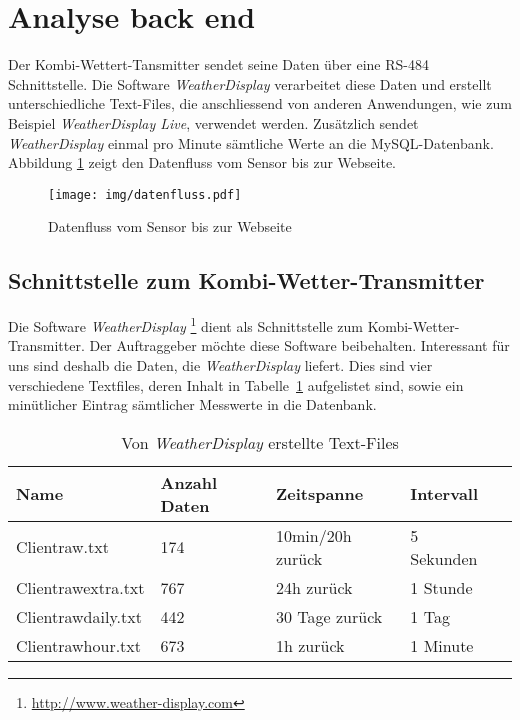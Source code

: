 \section{Analyse back end}
Der Kombi-Wettert-Tansmitter sendet seine Daten über eine RS-484 Schnittstelle. Die Software \textit{WeatherDisplay} verarbeitet diese Daten und erstellt unterschiedliche Text-Files, die anschliessend von anderen Anwendungen, wie zum Beispiel \textit{WeatherDisplay Live}, verwendet werden. Zusätzlich sendet \textit{WeatherDisplay} einmal pro Minute sämtliche Werte an die MySQL-Datenbank. Abbildung \ref{img:datenfluss} zeigt den Datenfluss vom Sensor bis zur Webseite. 

\begin{figure}[h!]
	\centering
	\texttt{[image: img/datenfluss.pdf]}
	\caption{Datenfluss vom Sensor bis zur Webseite}
	\label{img:datenfluss}
\end{figure}



\subsection{Schnittstelle zum Kombi-Wetter-Transmitter}
Die Software \textit{WeatherDisplay} \footnote{ \url{http://www.weather-display.com}} dient als Schnittstelle zum Kombi-Wetter-Transmitter. Der Auftraggeber möchte diese Software beibehalten. Interessant für uns sind deshalb die Daten, die  \textit{WeatherDisplay} liefert. Dies sind vier verschiedene Textfiles, deren Inhalt in Tabelle~\ref{table:text-files} aufgelistet sind, sowie ein minütlicher Eintrag sämtlicher Messwerte in die Datenbank.
\newline

\begin{table}[h]
\centering
\begin{tabular}{|l|l|l|l|l|}
\hline
 Name			&  Anzahl Daten	& 	Zeitspanne  		& 	Intervall			\\ \hline
 Clientraw.txt 		&  174			&  	10min/20h zurück 	& 	5 Sekunden 		\\ \hline
 Clientrawextra.txt	&  767 			&  	24h zurück 		& 	1 Stunde 			\\ \hline
 Clientrawdaily.txt 	&  442 			&  	30 Tage zurück 	&  	1 Tag 			\\ \hline
 Clientrawhour.txt	&  673			&  	1h zurück 			& 	1 Minute 			\\ \hline
\end{tabular}
\caption{Von \textit{WeatherDisplay} erstellte Text-Files}
\label{table:text-files}
\end{table}

